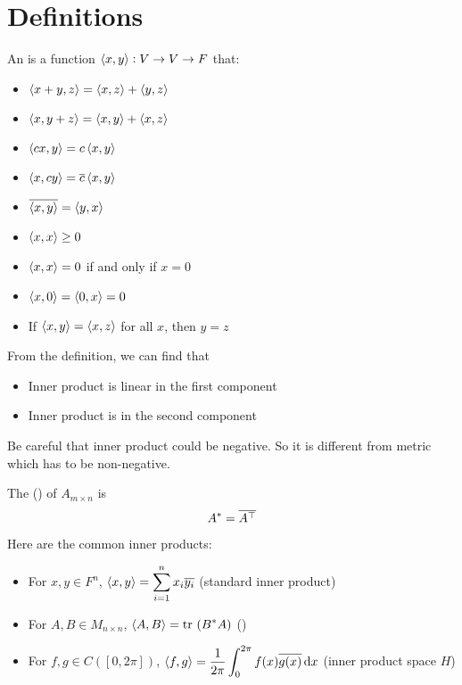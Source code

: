 \section{Definitions}

\begin{definition}
    An  is a function $\left\langle \displaystyle x, y \right\rangle: V \rightarrow V \rightarrow F$ that:
\begin{itemize}
    \item $\left\langle \displaystyle x + y, z \right\rangle = \left\langle \displaystyle x, z \right\rangle + \left\langle \displaystyle y, z \right\rangle$    
    \item $\left\langle \displaystyle x, y+z \right\rangle = \left\langle \displaystyle x, y \right\rangle + \left\langle \displaystyle x, z \right\rangle$
    \item $\left\langle \displaystyle cx, y \right\rangle = c \left\langle \displaystyle x, y \right\rangle$
    \item $\left\langle \displaystyle x, cy \right\rangle = \overline{c} \left\langle \displaystyle x, y \right\rangle$
    \item $\overline{\left\langle \displaystyle x, y \right\rangle} = \left\langle \displaystyle y, x \right\rangle$
    \item $\left\langle \displaystyle x, x \right\rangle \geq 0$
    \item $\left\langle \displaystyle x, x \right\rangle = 0$ if and only if $x = 0$
    \item $\left\langle \displaystyle x, 0 \right\rangle = \left\langle \displaystyle 0, x \right\rangle = 0$
    \item If $\left\langle \displaystyle x, y \right\rangle = \left\langle \displaystyle x, z \right\rangle$ for all $x$, then $y = z$
\end{itemize}
\end{definition}

From the definition, we can find that
\begin{itemize}
    \item Inner product is linear in the first component
    \item Inner product is  in the second component
\end{itemize}

Be careful that inner product could be negative. So it is different from metric which has to be non-negative.


\begin{definition}
    The  () of $A_{m \times n}$ is 
    \begin{equation}
        A^* = \overline{{A}^\top}
    \end{equation}
\end{definition}

\begin{example}
    Here are the common inner products:
\begin{itemize}
    \item For $x,y \in F^n$, $\displaystyle \left\langle \displaystyle x, y \right\rangle = \sum_{i=1}^n x_i \overline{y_i}$ (standard inner product)
    \item For $A,B \in M_{n \times n}$, $\left\langle \displaystyle A, B \right\rangle = \displaystyle \mathrm{tr}~( B^* A )$ ()
    \item For $f,g \in C([0,2 \pi])$, $\displaystyle \innerproduct{f}{g} = \frac{1}{2 \pi} \int_{0}^{2\pi} f(x) \conjugate{g(x)} \dif x$ (inner product space $H$)
\end{itemize}
\end{example}



